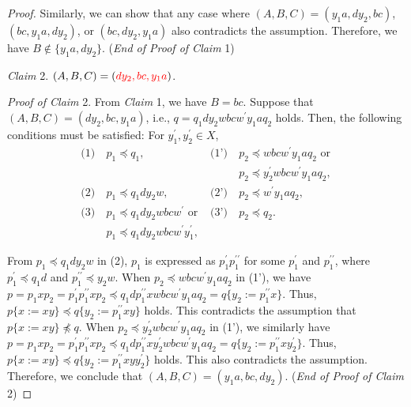\begin{proof}
  Similarly, we can show that any case where $(A, B, C) = (y_{1}a, dy_{2}, bc)$, $(bc, y_{1}a, dy_{2})$, or $(bc, dy_{2}, y_{1}a)$ also contradicts the assumption.
  Therefore, we have $B \not\in \{y_{1}a, dy_{2}\}$. (\textit{End of Proof of Claim} 1)

  \smallskip

  \noindent
  \textit{Claim} 2. $(A, B, C) = (\mbox{\color{red} $dy_{2}, bc, y_{1}a$})$.

  \smallskip
  \noindent
  \textit{Proof of Claim} 2.
  From \textit{Claim} 1, we have $B=bc$. Suppose that $(A, B, C) = (dy_{2}, bc, y_{1}a)$, i.e., $q = q_{1}dy_{2}wbcw^{\prime}y_{1}aq_{2} $ holds.
  Then, the following conditions must be satisfied: For $y_{1}^{\prime},y_{2}^{\prime}\in X$,
  \begin{align*}
  \textrm{(1)}~& p_{1} \preceq q_{1}, & \textrm{(1')}~& p_{2} \preceq wbcw^{\prime}y_{1}aq_{2}\mbox{ or}\\
  & & & p_{2} \preceq y_{2}^{\prime}wbcw^{\prime}y_{1}aq_{2},\\
  \textrm{(2)}~& p_{1} \preceq q_{1}dy_{2}w, & \textrm{(2')}~& p_{2} \preceq w^{\prime}y_{1}aq_{2}, \\
  \textrm{(3)}~& p_{1} \preceq q_{1}dy_{2}wbcw^{\prime}\mbox{ or } & \textrm{(3')}~& p_{2} \preceq q_{2}.\\
  & p_{1} \preceq q_{1}dy_{2}wbcw^{\prime}y_{1}^{\prime},& &
  \end{align*}
 
  From $p_{1} \preceq q_{1}dy_{2}w$ in (2), $p_{1}$ is expressed as $p^{\prime}_{1}p^{\prime\prime}_{1}$ for some $p^{\prime}_{1}$ and $p^{\prime\prime}_{1}$, where $p^{\prime}_{1} \preceq q_{1}d$ and $p^{\prime\prime}_{1} \preceq y_{2}w$. 
  When $p_{2} \preceq wbcw^{\prime}y_{1}aq_{2}$ in (1'), we have $p=p_{1}xp_{2}=p^{\prime}_{1}p^{\prime\prime}_{1}xp_{2} \preceq q_{1}dp^{\prime\prime}_{1}xwbcw^{\prime}y_{1}aq_{2}=q \{ y_{2}:=p^{\prime\prime}_{1}x \}$.
  Thus, $p \{ x := xy \} \preceq q \{ y_{2}:=p^{\prime\prime}_{1}xy \}$ holds.
  This contradicts the assumption that $p \{ x := xy \} \not \preceq q$.
  When $p_{2} \preceq y_{2}^{\prime}wbcw^{\prime}y_{1}aq_{2}$ in (1'), we similarly have $p=p_{1}xp_{2}=p^{\prime}_{1}p^{\prime\prime}_{1}xp_{2} \preceq q_{1}dp^{\prime\prime}_{1}xy_{2}^{\prime}wbcw^{\prime}y_{1}aq_{2}=q \{ y_{2}:=p^{\prime\prime}_{1}xy_{2}^{\prime} \}$.
  Thus, $p \{ x := xy \} \preceq q \{ y_{2}:=p^{\prime\prime}_{1}xyy_{2}^{\prime} \}$ holds.
  This also contradicts the assumption.
  Therefore, we conclude that $(A, B, C) = (y_{1}a, bc, dy_{2})$.
  (\textit{End of Proof of Claim} 2)


\end{proof}
